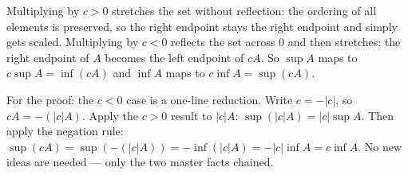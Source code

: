 \begin{remark*}
Multiplying by $c > 0$ stretches the set without reflection: the ordering
of all elements is preserved, so the right endpoint stays the right
endpoint and simply gets scaled.
Multiplying by $c < 0$ reflects the set across $0$ and then stretches:
the right endpoint of $A$ becomes the left endpoint of $cA$.
So $\sup A$ maps to $c\sup A = \inf(cA)$ and $\inf A$ maps to
$c\inf A = \sup(cA)$.

For the proof: the $c < 0$ case is a one-line reduction.
Write $c = -|c|$, so $cA = -(|c|A)$.
Apply the $c > 0$ result to $|c|A$: $\sup(|c|A) = |c|\sup A$.
Then apply the negation rule:
$\sup(cA) = \sup(-(|c|A)) = -\inf(|c|A) = -|c|\inf A = c\inf A$.
No new ideas are needed — only the two master facts chained.
\end{remark*}

